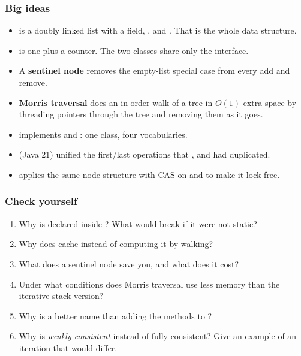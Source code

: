 \documentclass[aspectratio=169,10pt,compress]{beamer}
\begin{document}




\begin{frame}[t,fragile] \frametitle{Big ideas}
  \begin{itemize}
    \item {} is a doubly linked list with a
           field, , and .
          That is the whole data structure.
    \item {} is one  plus a
           counter. The two classes share only the interface.
    \item A \textbf{sentinel node} removes the empty-list special case
          from every add and remove.
    \item \textbf{Morris traversal} does an in-order walk of a tree in
          $O(1)$ extra space by threading  pointers
          through the tree and removing them as it goes.
    \item {} implements  and :
          one class, four vocabularies.
    \item {} (Java 21) unified the first/last
          operations that ,  and 
          had duplicated.
    \item {} applies the same node structure
          with CAS on  and  to make it lock-free.
  \end{itemize}
\end{frame}




\begin{frame}[t,fragile] \frametitle{Check yourself}
  \begin{enumerate}\small
    \item Why is  declared  inside
          ? What would break if it were not static?
    \item Why does  cache  instead of
          computing it by walking?
    \item What does a sentinel node save you, and what does it cost?
    \item Under what conditions does Morris traversal use less memory
          than the iterative stack version?
    \item Why is  a better name than
          adding the methods to ?
    \item Why is  \emph{weakly consistent}
          instead of fully consistent? Give an example of an iteration
          that would differ.
  \end{enumerate}
\end{frame}
\end{document}
